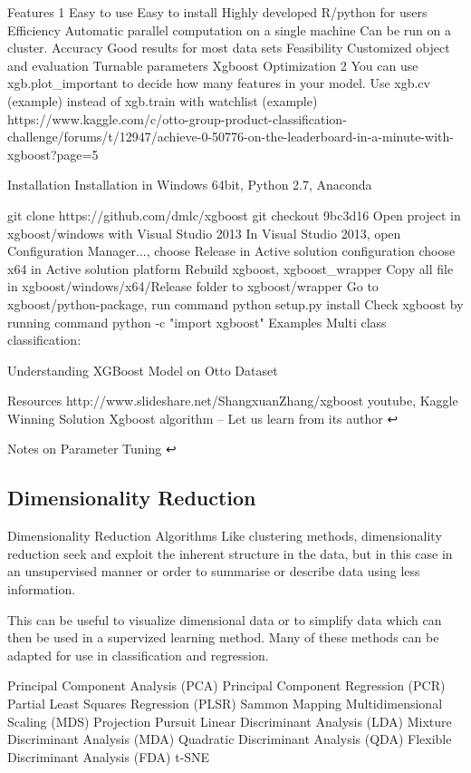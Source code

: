 Features 1
Easy to use
Easy to install
Highly developed R/python for users
Efficiency
Automatic parallel computation on a single machine
Can be run on a cluster.
Accuracy
Good results for most data sets
Feasibility
Customized object and evaluation
Turnable parameters
Xgboost Optimization 2
You can use xgb.plot_important to decide how many features in your model.
Use xgb.cv (example) instead of xgb.train with watchlist (example)
https://www.kaggle.com/c/otto-group-product-classification-challenge/forums/t/12947/achieve-0-50776-on-the-leaderboard-in-a-minute-with-xgboost?page=5

Installation
Installation in Windows 64bit, Python 2.7, Anaconda

git clone https://github.com/dmlc/xgboost
git checkout 9bc3d16
Open project in xgboost/windows with Visual Studio 2013
In Visual Studio 2013, open Configuration Manager...,
choose Release in Active solution configuration
choose x64 in Active solution platform
Rebuild xgboost, xgboost_wrapper
Copy all file in xgboost/windows/x64/Release folder to xgboost/wrapper
Go to xgboost/python-package, run command python setup.py install
Check xgboost by running command python -c "import xgboost"
Examples
Multi class classification:

Understanding XGBoost Model on Otto Dataset

Resources
http://www.slideshare.net/ShangxuanZhang/xgboost
youtube, Kaggle Winning Solution Xgboost algorithm -- Let us learn from its author ↩

Notes on Parameter Tuning ↩

\subsection{Dimensionality Reduction}


Dimensionality Reduction Algorithms
Like clustering methods, dimensionality reduction seek and exploit the inherent structure in the data, but in this case in an unsupervised manner or order to summarise or describe data using less information.

This can be useful to visualize dimensional data or to simplify data which can then be used in a supervized learning method. Many of these methods can be adapted for use in classification and regression.

Principal Component Analysis (PCA)
Principal Component Regression (PCR)
Partial Least Squares Regression (PLSR)
Sammon Mapping
Multidimensional Scaling (MDS)
Projection Pursuit
Linear Discriminant Analysis (LDA)
Mixture Discriminant Analysis (MDA)
Quadratic Discriminant Analysis (QDA)
Flexible Discriminant Analysis (FDA)
t-SNE



